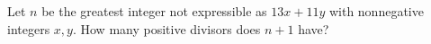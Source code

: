 Let $ n $ be the greatest integer not expressible as $ 13x+11y $ with nonnegative integers $ x,y $. How many positive divisors does $ n+1 $ have?
